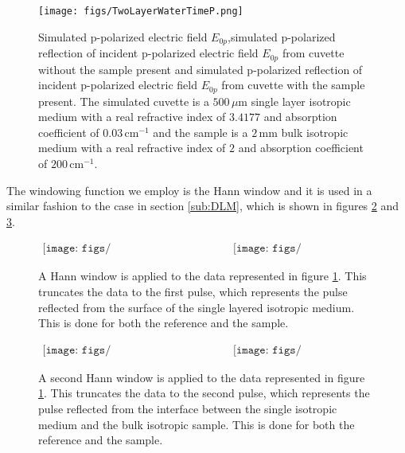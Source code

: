 \begin{figure}[H]
\begin{center}
	 \texttt{[image: figs/TwoLayerWaterTimeP.png]}
	 \caption[Simulated example of a single layer isotropic medium deposited on a bulk isotropic sample only p-polarization]{Simulated p-polarized electric field $E_{0p}$,simulated p-polarized reflection of incident p-polarized electric field $E_{0p}$ from cuvette without the sample present and simulated p-polarized reflection of incident p-polarized electric field $E_{0p}$ from cuvette with the sample present. The simulated cuvette is a $500\,\mu $m single layer isotropic medium with a real refractive index of $3.4177$ and absorption coefficient of $0.03\,\mbox{cm}^{-1}$ and the sample is a $2\,\mbox{mm}$ bulk isotropic medium with a real refractive index of $2$ and absorption coefficient of $200\,\mbox{cm}^{-1}$.}
   \label{fig:DoubleTimeP}
\end{center}
\end{figure}

The windowing function we employ is the Hann window and it is used in a similar fashion to the case in section \ref{sub:DLM}, which is shown in figures \ref{fig:DoubleGauss1P} and \ref{fig:DoubleGauss2P}.

\begin{figure}[H]
                \begin{center}$
								\begin{array}{cc}
                \texttt{[image: figs/TwoLayerWaterTimeWindow125P.png]}&
                \texttt{[image: figs/TwoLayerWaterTimeWindow1app25P.png]}
								\end{array}$
								\end{center}
	\caption[Application of Hann window to truncate to first pulse]{A Hann window is applied to the data represented in figure \ref{fig:DoubleTimeP}. This truncates the data to the first pulse, which represents the pulse reflected from the surface of the single layered isotropic medium. This is done for both the reference and the sample.}
	\label{fig:DoubleGauss1P}
\end{figure}

\begin{figure}[H]
                \begin{center}$
								\begin{array}{cc}
                \texttt{[image: figs/TwoLayerWaterTimeWindow225P.png]}&
                \texttt{[image: figs/TwoLayerWaterTimeWindow2app25P.png]}
								\end{array}$
								\end{center}
	\caption[Application of Hann window to truncate to second pulse]{A second Hann window is applied to the data represented in figure \ref{fig:DoubleTimeP}. This truncates the data to the second pulse, which represents the pulse reflected from the interface between the single isotropic medium and the bulk isotropic sample. This is done for both the reference and the sample.}
	\label{fig:DoubleGauss2P}
\end{figure}

